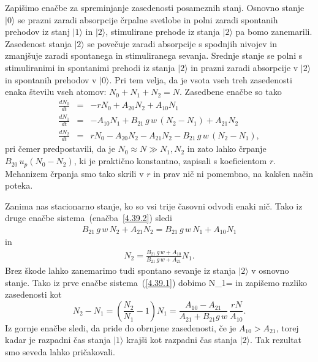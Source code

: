 Zapišimo enačbe za spreminjanje zasedenosti posameznih stanj. Osnovno stanje
$|0\rangle$ se prazni zaradi absorpcije črpalne svetlobe in polni zaradi
spontanih prehodov iz stanj $|1\rangle$ in $|2\rangle$, stimulirane
prehode iz stanja $|2\rangle$ pa bomo zanemarili. Zasedenost stanja $|2\rangle$ se
povečuje zaradi absorpcije s spodnjih nivojev in zmanjšuje
zaradi spontanega in stimuliranega sevanja. Srednje stanje se polni
s stimuliranimi in spontanimi prehodi iz stanja $|2\rangle$ in prazni
zaradi absorpcije v $|2\rangle$ in spontanih prehodov v $|0\rangle$.
Pri tem velja, da je vsota vseh treh zasedenosti enaka številu vseh atomov: $N_{0}+N_{1}+N_{2}=N$. 
Zasedbene enačbe so tako
\begin{eqnarray}
\frac{dN_{0}}{dt} & = & -rN_0+A_{20}N_{2}+A_{10}N_{1} \label{4.39.1}\\
\frac{dN_{1}}{dt} & = & -A_{10}N_{1}+B_{21}\,g\,w\, (N_{2}-N_{1})+A_{21}N_{2} \label{4.39.2}\\
\frac{dN_{2}}{dt} & = & rN_0-A_{20}N_{2}-A_{21}N_{2}-B_{21}\,g\,w\, (N_2-N_1),
\label{4.39}
\end{eqnarray}
pri čemer predpostavili, da je $N_0 \approx N \gg N_1, N_2$ in zato lahko črpanje $B_{20}\, 
u_{p} (N_0-N_2)$, ki je praktično konstantno, zapisali s koeficientom $r$. Mehanizem črpanja 
smo tako skrili v $r$ in prav nič ni pomembno, na kakšen način poteka.

Zanima nas stacionarno stanje, ko so vsi trije časovni odvodi enaki nič. 
Tako iz druge enačbe sistema~(enačba~\ref{4.39.2}) sledi
\begin{eqnarray}
B_{21}\,g\,w\, N_{2}+A_{21}N_{2} = B_{21}\,g\,w\, N_{1} + A_{10}N_{1} 
\end{eqnarray}
in
\begin{eqnarray}
N_2 = \frac{B_{21}\,g\,w + A_{10}}{B_{21}\,g\,w+A_{21}}N_1.  
\end{eqnarray}
Brez škode lahko zanemarimo tudi spontano sevanje iz stanja
$|2\rangle$ v osnovno stanje. Tako iz prve enačbe sistema~(\ref{4.39.1}) dobimo 
\beq
N_1= 
\eeq
in zapišemo razliko zasedenosti kot 
\begin{equation}
N_{2}-N_{1}=\left(\frac{N_2}{N_1}-1\right)N_1=\frac{A_{10}-A_{21}}{A_{21}+
B_{21}g\,w} \,\frac{rN}{A_{10}}.
\label{4.42}
\end{equation}
Iz gornje enačbe sledi, da pride do obrnjene 
zasedenosti, če je $A_{10}>A_{21}$, torej kadar je
razpadni čas stanja $|1\rangle$ krajši kot razpadni čas stanja $|2\rangle$.
Tak rezultat smo seveda lahko pričakovali.

